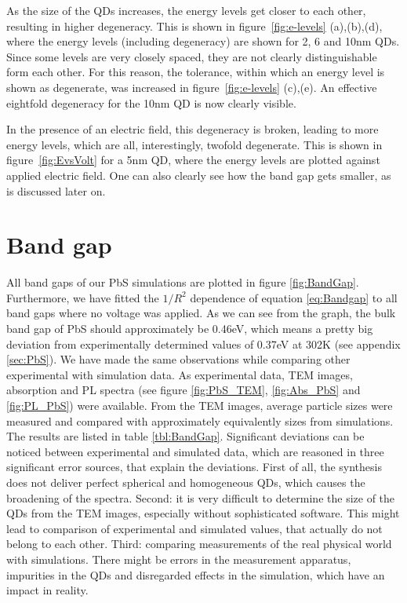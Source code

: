 As the size of the QDs increases, the energy levels get closer to each other, resulting in higher degeneracy. This is shown in figure~\ref{fig:e-levels} (a),(b),(d), where the energy levels (including degeneracy) are shown for 2, 6 and 10nm QDs. Since some levels are very closely spaced, they are not clearly distinguishable form each other. For this reason, the tolerance, within which an energy level is shown as degenerate, was increased in figure~\ref{fig:e-levels} (c),(e). An effective eightfold degeneracy for the 10nm QD is now clearly visible.
	
In the presence of an electric field, this degeneracy is broken, leading to more energy levels, which are all, interestingly, twofold degenerate. This is shown in figure~\ref{fig:EvsVolt} for a 5nm QD, where the energy levels are plotted against applied electric field. One can also clearly see how the band gap gets smaller, as is discussed later on.
\FloatBarrier

\section{Band gap} \label{sec:BandGapAnalysis}
	All band gaps of our PbS simulations are plotted in figure \ref{fig:BandGap}. Furthermore, we have fitted the $1/R^2$ dependence of
	equation \ref{eq:Bandgap} to all band gaps where no voltage was applied.
	As we can see from the graph, the bulk band gap of \gls{PbS} should approximately be 0.46eV, which means a pretty big deviation
	from experimentally determined values of 0.37eV at 302K (see appendix \ref{sec:PbS}). We have made the same observations while comparing
	other experimental with simulation data. As experimental data, \gls{TEM} images, absorption and \gls{PL} spectra (see figure \ref{fig:PbS_TEM},
	\ref{fig:Abs_PbS} and \ref{fig:PL_PbS}) were available. From the \gls{TEM} images, average particle sizes were measured and compared
	with approximately equivalently sizes from simulations. The results are listed in table \ref{tbl:BandGap}. Significant deviations
	can be noticed between experimental and simulated data, which are reasoned in three significant error sources, that explain the deviations.
	First of all, the synthesis does not deliver perfect spherical and homogeneous \glspl{QD}, which causes the broadening of the spectra.
	Second: it is very difficult to determine the size of the \glspl{QD} from the \gls{TEM} images, especially without
	sophisticated software. This might lead to comparison of experimental and simulated values, that actually do not belong to each other.
	Third: comparing measurements of the real physical world with simulations. There might be errors in the measurement
	apparatus, impurities in the \glspl{QD} and disregarded effects in the simulation, which have an impact in reality.
	
